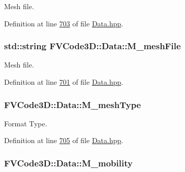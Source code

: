 Mesh file. 



Definition at line \hyperlink{Data_8hpp_source_l00703}{703} of file \hyperlink{Data_8hpp_source}{Data.\+hpp}.

\subsubsection[{\texorpdfstring{M\+\_\+mesh\+File}{M_meshFile}}]{\setlength{\rightskip}{0pt plus 5cm}std\+::string F\+V\+Code3\+D\+::\+Data\+::\+M\+\_\+mesh\+File\hspace{0.3cm}{\ttfamily [protected]}}\hypertarget{classFVCode3D_1_1Data_ab939b8425e4b01d2c000adfb0ea2d35a}{}\label{classFVCode3D_1_1Data_ab939b8425e4b01d2c000adfb0ea2d35a}


Mesh file. 



Definition at line \hyperlink{Data_8hpp_source_l00701}{701} of file \hyperlink{Data_8hpp_source}{Data.\+hpp}.

\subsubsection[{\texorpdfstring{M\+\_\+mesh\+Type}{M_meshType}}]{ F\+V\+Code3\+D\+::\+Data\+::\+M\+\_\+mesh\+Type\hspace{0.3cm}{\ttfamily [protected]}}\hypertarget{classFVCode3D_1_1Data_a3829da70dbf5688d6188ec0108bae59d}{}\label{classFVCode3D_1_1Data_a3829da70dbf5688d6188ec0108bae59d}


Format Type. 



Definition at line \hyperlink{Data_8hpp_source_l00705}{705} of file \hyperlink{Data_8hpp_source}{Data.\+hpp}.

\subsubsection[{\texorpdfstring{M\+\_\+mobility}{M_mobility}}]{ F\+V\+Code3\+D\+::\+Data\+::\+M\+\_\+mobility\hspace{0.3cm}{\ttfamily [protected]}}\hypertarget{classFVCode3D_1_1Data_ace221dee0530a79694fbc1d2beca96ac}{}\label{classFVCode3D_1_1Data_ace221dee0530a79694fbc1d2beca96ac}


